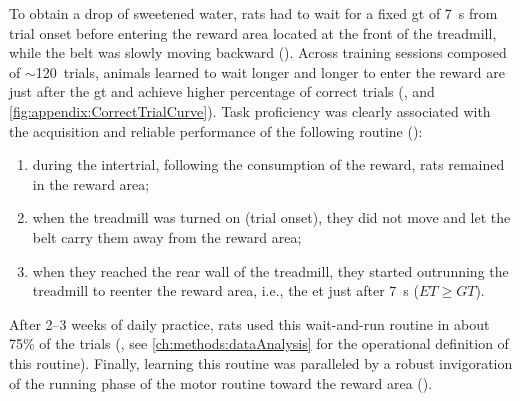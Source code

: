To obtain a drop of sweetened water, rats had to wait for a fixed \gls{gt} of 7~s from trial onset before entering the reward area located at the front of the treadmill, while the belt was slowly moving backward ().
Across training sessions composed of $\sim$120~trials, animals learned to wait longer and longer to enter the reward are just after the \gls{gt} and achieve higher percentage of correct trials (, and \autoref{fig:appendix:CorrectTrialCurve}).
Task proficiency was clearly associated with the acquisition and reliable performance of the following routine ():
\begin{enumerate}[noitemsep]
    \item during the intertrial, following the consumption of the reward, rats remained in the reward area;
    \item when the treadmill was turned on (trial onset), they did not move and let the belt carry them away from the reward area;
    \item when they reached the rear wall of the treadmill, they started outrunning the treadmill to reenter the reward area, i.e., the \gls{et} just after 7~s ($ET\geq GT$).
\end{enumerate}
After 2--3 weeks of daily practice, rats used this wait-and-run routine in about 75\% of the trials (, see \autoref{ch:methods:dataAnalysis} for the operational definition of this routine).
Finally, learning this routine was paralleled by a robust invigoration of the running phase of the motor routine toward the reward area ().

